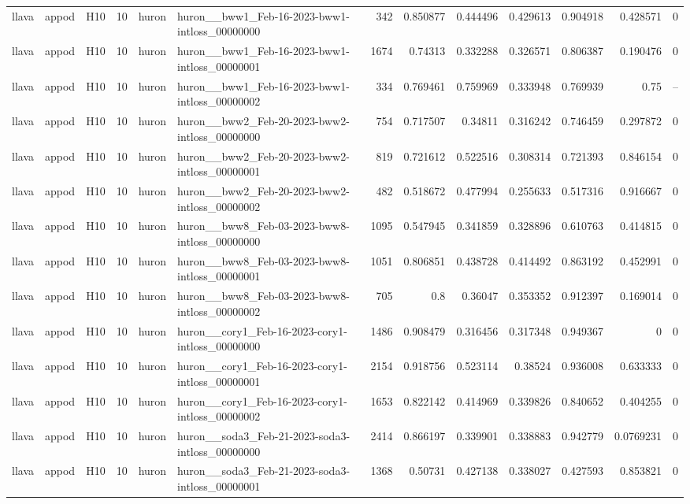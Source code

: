 \begin{longtable}{lllrllrrrrrrr}
llava & appod & H10 & 10 & huron & huron\_\_bww1\_Feb-16-2023-bww1-intloss\_00000000 & 342 & 0.850877 & 0.444496 & 0.429613 & 0.904918 & 0.428571 & 0 \\
llava & appod & H10 & 10 & huron & huron\_\_bww1\_Feb-16-2023-bww1-intloss\_00000001 & 1674 & 0.74313 & 0.332288 & 0.326571 & 0.806387 & 0.190476 & 0 \\
llava & appod & H10 & 10 & huron & huron\_\_bww1\_Feb-16-2023-bww1-intloss\_00000002 & 334 & 0.769461 & 0.759969 & 0.333948 & 0.769939 & 0.75 & -- \\
llava & appod & H10 & 10 & huron & huron\_\_bww2\_Feb-20-2023-bww2-intloss\_00000000 & 754 & 0.717507 & 0.34811 & 0.316242 & 0.746459 & 0.297872 & 0 \\
llava & appod & H10 & 10 & huron & huron\_\_bww2\_Feb-20-2023-bww2-intloss\_00000001 & 819 & 0.721612 & 0.522516 & 0.308314 & 0.721393 & 0.846154 & 0 \\
llava & appod & H10 & 10 & huron & huron\_\_bww2\_Feb-20-2023-bww2-intloss\_00000002 & 482 & 0.518672 & 0.477994 & 0.255633 & 0.517316 & 0.916667 & 0 \\
llava & appod & H10 & 10 & huron & huron\_\_bww8\_Feb-03-2023-bww8-intloss\_00000000 & 1095 & 0.547945 & 0.341859 & 0.328896 & 0.610763 & 0.414815 & 0 \\
llava & appod & H10 & 10 & huron & huron\_\_bww8\_Feb-03-2023-bww8-intloss\_00000001 & 1051 & 0.806851 & 0.438728 & 0.414492 & 0.863192 & 0.452991 & 0 \\
llava & appod & H10 & 10 & huron & huron\_\_bww8\_Feb-03-2023-bww8-intloss\_00000002 & 705 & 0.8 & 0.36047 & 0.353352 & 0.912397 & 0.169014 & 0 \\
llava & appod & H10 & 10 & huron & huron\_\_cory1\_Feb-16-2023-cory1-intloss\_00000000 & 1486 & 0.908479 & 0.316456 & 0.317348 & 0.949367 & 0 & 0 \\
llava & appod & H10 & 10 & huron & huron\_\_cory1\_Feb-16-2023-cory1-intloss\_00000001 & 2154 & 0.918756 & 0.523114 & 0.38524 & 0.936008 & 0.633333 & 0 \\
llava & appod & H10 & 10 & huron & huron\_\_cory1\_Feb-16-2023-cory1-intloss\_00000002 & 1653 & 0.822142 & 0.414969 & 0.339826 & 0.840652 & 0.404255 & 0 \\
llava & appod & H10 & 10 & huron & huron\_\_soda3\_Feb-21-2023-soda3-intloss\_00000000 & 2414 & 0.866197 & 0.339901 & 0.338883 & 0.942779 & 0.0769231 & 0 \\
llava & appod & H10 & 10 & huron & huron\_\_soda3\_Feb-21-2023-soda3-intloss\_00000001 & 1368 & 0.50731 & 0.427138 & 0.338027 & 0.427593 & 0.853821 & 0 \\

\end{longtable}
